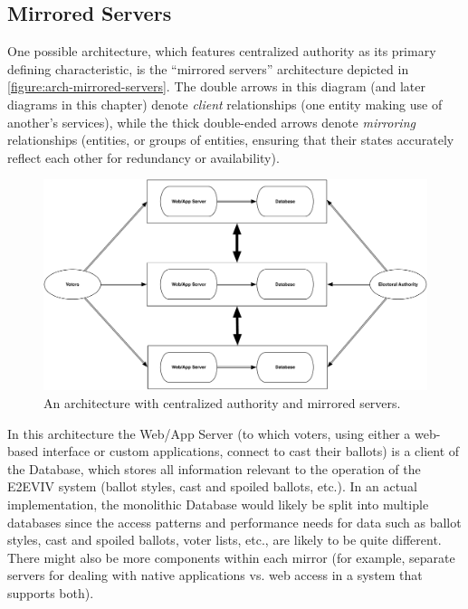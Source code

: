 \subsection{Mirrored Servers}

One possible architecture, which features centralized authority as its
primary defining characteristic, is the ``mirrored servers''
architecture depicted in \autoref{figure:arch-mirrored-servers}. The
double arrows in this diagram (and later diagrams in this chapter)
denote \emph{client} relationships (one entity making use of another's
services), while the thick double-ended arrows denote \emph{mirroring}
relationships (entities, or groups of entities, ensuring that their
states accurately reflect each other for redundancy or availability).

\begin{figure}[t]
\begin{center}
\includegraphics[width=6.5in]{architecture_resources/mirrored-servers.pdf}
\end{center}
\caption{An architecture with centralized authority and mirrored
  servers.}
\label{figure:arch-mirrored-servers}
\end{figure}

In this architecture the Web/App Server (to which voters, using either
a web-based interface or custom applications, connect to cast their
ballots) is a client of the Database, which stores all information
relevant to the operation of the E2EVIV system (ballot styles, cast
and spoiled ballots, etc.). In an actual implementation, the
monolithic Database would likely be split into multiple databases
since the access patterns and performance needs for data such as
ballot styles, cast and spoiled ballots, voter lists, etc., are likely
to be quite different. There might also be more components within each
mirror (for example, separate servers for dealing with native
applications vs. web access in a system that supports both).

